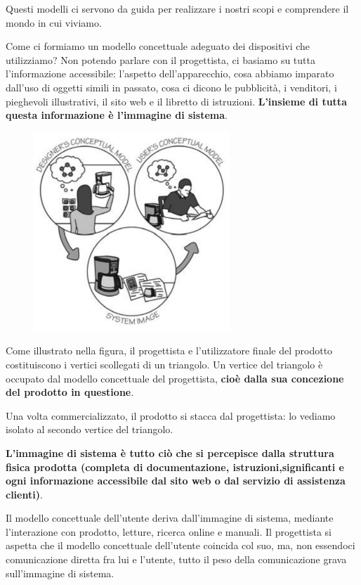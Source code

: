 \documentclass[a4paper,11pt,oneside]{book}
\begin{document}
Questi modelli ci servono da guida per realizzare i nostri scopi e comprendere il mondo in cui viviamo.

Come ci formiamo un modello concettuale adeguato dei dispositivi che utilizziamo? Non potendo parlare con il progettista, ci basiamo su tutta l'informazione accessibile: l'aspetto dell'apparecchio, cosa abbiamo imparato dall'uso di oggetti simili in passato, cosa ci dicono le pubblicità, i venditori, i pieghevoli illustrativi, il sito web e il libretto di istruzioni. \textbf{L'insieme di tutta questa informazione è l'immagine di sistema}.

\begin{figure}[!h]
	\centering
	\includegraphics[scale = 0.75]{"immagini/Immagine di Sistema"}
\end{figure}

Come illustrato nella figura, il progettista e l'utilizzatore finale del prodotto costituiscono i vertici scollegati di un triangolo. Un vertice del triangolo è occupato dal modello concettuale del progettista, \textbf{cioè dalla sua concezione del prodotto in questione}.

Una volta commercializzato, il prodotto si stacca dal progettista: lo vediamo isolato al secondo vertice del triangolo.

\textbf{L'immagine di sistema è tutto ciò che si percepisce dalla struttura fisica prodotta (completa di documentazione, istruzioni,significanti e ogni informazione accessibile dal sito web o dal servizio di assistenza clienti)}.

Il modello concettuale dell'utente deriva dall'immagine di sistema, mediante l'interazione con prodotto, letture, ricerca online e manuali. Il progettista si aspetta che il modello concettuale dell'utente coincida col suo, ma, non essendoci comunicazione diretta fra lui e l'utente, tutto il peso della comunicazione grava sull'immagine di sistema.
\end{document}

